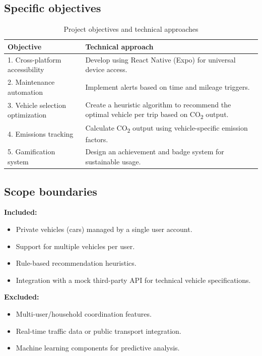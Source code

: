\subsection{Specific objectives}
\begin{table}[h]
    \centering
    \caption{Project objectives and technical approaches}
    \begin{tabular}{@{}p{} p{}@{}}
        \toprule
        \textbf{Objective} & \textbf{Technical approach} \\ \midrule
        1. Cross-platform accessibility & Develop using React Native (Expo) for universal device access. \\
        2. Maintenance automation & Implement alerts based on time and mileage triggers. \\
        3. Vehicle selection optimization & Create a heuristic algorithm to recommend the optimal vehicle per trip based on CO\textsubscript{2} output. \\
        4. Emissions tracking & Calculate CO\textsubscript{2} output using vehicle-specific emission factors. \\
        5. Gamification system & Design an achievement and badge system for sustainable usage. \\ \bottomrule
    \end{tabular}
\end{table}

\subsection{Scope boundaries}
\textbf{Included:}
\begin{itemize}
    \item Private vehicles (cars) managed by a single user account.
    \item Support for multiple vehicles per user.
    \item Rule-based recommendation heuristics.
    \item Integration with a mock third-party API for technical vehicle specifications.
\end{itemize}

\textbf{Excluded:}
\begin{itemize}
    \item Multi-user/household coordination features.
    \item Real-time traffic data or public transport integration.
    \item Machine learning components for predictive analysis.
\end{itemize}

